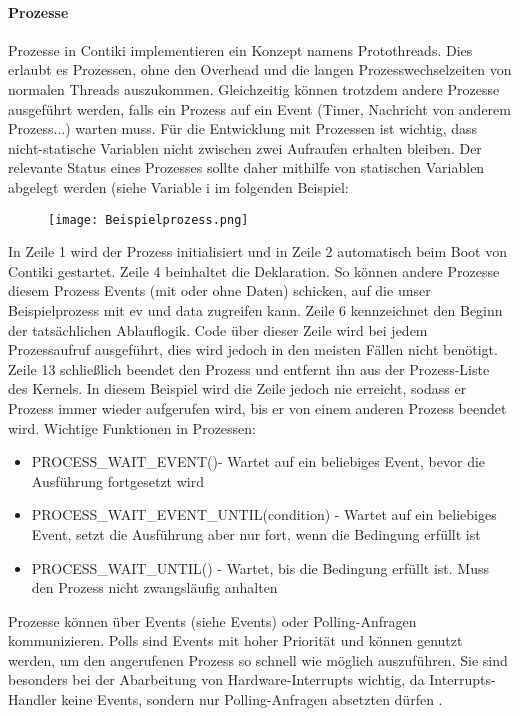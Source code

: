 \paragraph{Prozesse}
Prozesse in Contiki implementieren ein Konzept namens Protothreads. Dies erlaubt es Prozessen, ohne den Overhead und die langen 
Prozesswechselzeiten von normalen Threads auszukommen. Gleichzeitig k\"onnen trotzdem andere Prozesse ausgef\"uhrt werden, falls
ein Prozess auf ein Event (Timer, Nachricht von anderem Prozess...) warten muss. F\"ur die Entwicklung mit Prozessen ist wichtig, 
dass nicht-statische Variablen nicht zwischen zwei Aufraufen erhalten bleiben. Der relevante Status eines Prozesses sollte daher 
mithilfe von statischen Variablen abgelegt werden (siehe Variable i im folgenden Beispiel:

\begin{figure}[h!]
	\centering
		\texttt{[image: Beispielprozess.png]}
	\label{Beispielprozess}
\end{figure}
In Zeile 1 wird der Prozess initialisiert und in Zeile 2 automatisch beim Boot von Contiki gestartet. Zeile 4 beinhaltet die
Deklaration. So k\"onnen andere Prozesse diesem Prozess Events (mit oder ohne Daten) schicken, auf die unser Beispielprozess 
mit ev und data zugreifen kann. Zeile 6 kennzeichnet den Beginn der tats\"achlichen Ablauflogik. Code \"uber dieser Zeile wird 
bei jedem Prozessaufruf ausgef\"uhrt, dies wird jedoch in den meisten F\"allen nicht ben\"otigt. Zeile 13 schlie{\ss}lich beendet
den Prozess und entfernt ihn aus der Prozess-Liste des Kernels. In diesem Beispiel wird die Zeile jedoch nie erreicht, sodass er
Prozess immer wieder aufgerufen wird, bis er von einem anderen Prozess beendet wird.
Wichtige Funktionen in Prozessen:
\begin{itemize}
\item PROCESS\_WAIT\_EVENT()- Wartet auf ein beliebiges Event, bevor die Ausf\"{u}hrung fortgesetzt wird
\item PROCESS\_WAIT\_EVENT\_UNTIL(condition) - Wartet auf ein beliebiges Event, setzt die Ausf\"{u}hrung aber nur fort, wenn die Bedingung erf\"{u}llt ist
\item PROCESS\_WAIT\_UNTIL() - Wartet, bis die Bedingung erf\"ullt ist. Muss den Prozess nicht zwangsl\"{a}ufig anhalten
\end{itemize}
Prozesse k\"onnen \"uber Events (siehe Events) oder Polling-Anfragen kommunizieren.  Polls sind Events mit hoher Priorit\"at und 
k\"onnen genutzt werden, um den angerufenen Prozess so schnell wie m\"oglich auszuf\"uhren. Sie
sind besonders bei der Abarbeitung von Hardware-Interrupts wichtig, da Interrupts-Handler keine Events, sondern nur
Polling-Anfragen absetzten d\"urfen \cite[vgl.][S. 7]{Walter:2010}.
